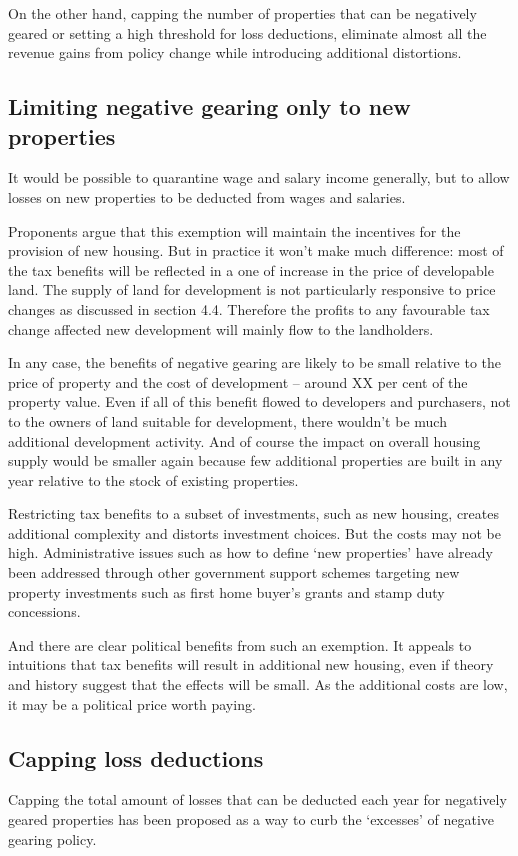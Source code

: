 \documentclass{grattan}\usepackage[]{graphicx}\usepackage[]{color}
\begin{document}
On the other hand, capping the number of properties that can be negatively geared or setting a high threshold for loss deductions, eliminate almost all the revenue gains from policy change while introducing additional distortions. 

\subsection{Limiting negative gearing only to new properties}
It would be possible to quarantine wage and salary income generally, but to allow losses on new properties to be deducted from wages and salaries. 

Proponents argue that this exemption will maintain the incentives for the provision of new housing.  But in practice it won't make much difference: most of the tax benefits will be reflected in a one of increase in the price of developable land. The supply of land for development is not particularly responsive to price changes as discussed in section 4.4. Therefore the profits to any favourable tax change affected new development will mainly flow to the landholders. 



In any case, the benefits of negative gearing are likely to be small relative to the price of property and the cost of development -- around XX per cent of the property value.  Even if all of this benefit flowed to developers and purchasers, not to the owners of land suitable for development, there wouldn't be much additional development activity. And of course the impact on overall housing supply would be smaller again because few additional properties are built in any year relative to the stock of existing properties. 

Restricting tax benefits to a subset of investments, such as new housing, creates additional complexity and distorts investment choices. But the costs may not be high. Administrative issues such as how to define `new properties' have already been addressed through  other government support schemes targeting new property investments such as first home buyer's grants and stamp duty concessions. 

And there are clear political benefits from such an exemption.  It appeals to intuitions that tax benefits will result in additional new housing, even if theory and history suggest that the effects will be small.  As the additional costs are low, it may be a political price worth paying.

\subsection{Capping loss deductions}
Capping the total amount of losses that can be deducted each year for negatively geared properties has been proposed as a way to curb the `excesses' of negative gearing policy. 
\end{document}
